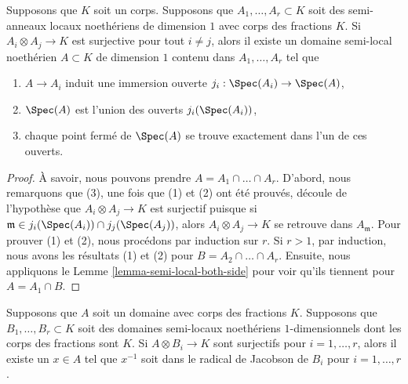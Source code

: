 \begin{lemma}
\label{lemma-glue-a-bunch-of-local-rings}
Supposons que $K$ soit un corps. Supposons que $A_1, \ldots, A_r
\subset K$ soit des semi-anneaux locaux noethériens de dimension $1$
avec corps des fractions $K$. Si $A_i \otimes A_j \to K$ est surjective
pour tout $i \not = j$, alors il existe un domaine semi-local noethérien
$A \subset K$ de dimension $1$ contenu dans $A_1, \ldots, A_r$ tel que
\begin{enumerate}
\item $A \to A_i$ induit une immersion ouverte $j_i :
\Spec(A_i) \to \Spec(A)$, \item $\Spec(A)$ est l'union
des ouverts $j_i(\Spec(A_i))$, \item chaque point fermé de
$\Spec(A)$ se trouve exactement dans l'un de ces ouverts.
\end{enumerate}
\end{lemma}

\begin{proof}
À savoir, nous pouvons prendre $A = A_1 \cap \ldots \cap
A_r$. D'abord, nous remarquons que (3), une fois que (1) et
(2) ont été prouvés, découle de l'hypothèse que $A_i \otimes
A_j \to K$ est surjectif puisque si $\mathfrak m \in
j_i(\Spec(A_i)) \cap j_j(\Spec(A_j))$, alors $A_i \otimes A_j
\to K$ se retrouve dans $A_\mathfrak m$. Pour prouver (1) et
(2), nous procédons par induction sur $r$. Si $r > 1$, par
induction, nous avons les résultats (1) et (2) pour $B = A_2 \cap
\ldots \cap A_r$. Ensuite, nous appliquons le Lemme
\ref{lemma-semi-local-both-side} pour voir qu'ils tiennent pour $A = A_1 \cap B$.
\end{proof}

\begin{lemma}
\label{lemma-create-globally-generated}
Supposons que $A$ soit un domaine avec corps des fractions $K$. Supposons que
$B_1, \ldots, B_r \subset K$ soit des domaines semi-locaux noethériens
$1$-dimensionnels dont les corps des fractions sont $K$. Si $A \otimes B_i \to
K$ sont surjectifs pour $i = 1, \ldots, r$, alors il existe un $x \in A$ tel
que $x^{-1}$ soit dans le radical de Jacobson de $B_i$ pour $i = 1, \ldots, r$.
\end{lemma}

